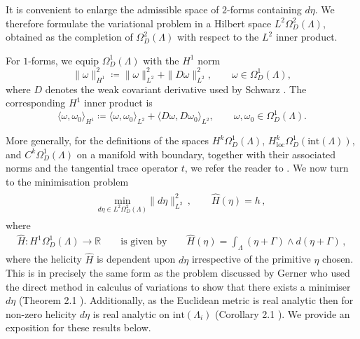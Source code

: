 \documentclass[11pt]{article}
\theoremstyle{plain}
\theoremstyle{definition}
\theoremstyle{remark}
\newcommand{\R}{\mathbb{R}}
\newcommand{\ST}{\Lambda}
\begin{document}
It is convenient to enlarge the admissible space of $2$-forms containing $d\eta$. We therefore formulate the variational problem in a Hilbert space \(L^2\Omega_D^2(\ST)\), obtained as the completion of $\Omega_D^2(\ST)$ with respect to the $L^2$ inner product.

For $1$-forms, we equip $\Omega_D^1(\ST)$ with the $H^1$ norm
\[
\|\omega\|_{H^1}^2 \coloneqq \|\omega\|_{L^2}^2 + \|D\omega\|_{L^2}^2,
\qquad \omega \in \Omega_D^1(\ST),
\]
where $D$ denotes the weak covariant derivative used by Schwarz \cite{schwarz-1995}. The corresponding $H^1$ inner product is
\[
\langle \omega,\omega_0\rangle_{H^1}
\coloneqq
\langle \omega,\omega_0\rangle_{L^2}
+
\langle D\omega, D\omega_0\rangle_{L^2},
\qquad \omega,\omega_0 \in \Omega_D^1(\ST).
\]

More generally, for the definitions of the spaces $H^k\Omega_D^1(\ST)$, $H^k_{\mathrm{loc}}\Omega_D^1( \text{int}( \ST ) )$, and $C^k\Omega_D^1(\ST)$ on a manifold with boundary, together with their associated norms and the tangential trace operator $t$, we refer the reader to \cite{schwarz-1995}. We now turn to the minimisation problem
\begin{align}\label{prob:inter} 
    \begin{gathered} 
    \underset{  d \eta \in L^2 \Omega^2_D(\ST)}{ \text{min}}   \| d \eta  \|_{L^2}^2  \, , \qquad 
    \hat H ( \eta) = h  \, ,
    \end{gathered}
\end{align}
where 
\begin{align*}
    \hat H  : H^1 \Omega^1_D(\ST) \to \R \qquad \text{is given by} \qquad \hat H  ( \eta) = \int_{\ST} (\eta + \Gamma) \wedge d (\eta + \Gamma)  \, ,
\end{align*}
where the helicity \(\hat H\) is dependent upon \( d \eta\) irrespective of the primitive \(\eta\) chosen. This is in precisely the same form as the problem discussed by Gerner who used the direct method in calculus of variations to show that there exists a minimiser \(d \eta \) (Theorem 2.1 \cite{exist_gerner}). Additionally, as the Euclidean metric is real analytic then for non-zero helicity \(d \eta\) is real analytic on \(\text{int}(\ST_i)\) (Corollary 2.1 \cite{exist_gerner}). We provide an exposition for these results below.
\end{document}

